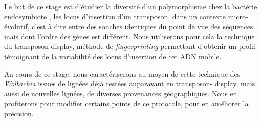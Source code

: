 Le but de ce stage est d'étudier la diversité d'un polymorphisme chez la
bactérie endosymbiote , les locus d'insertion d'un transposon,
dans un contexte micro-évolutif, c'est à dire entre des souches identiques du
point de vue des séquences, mais dont l'ordre des gènes est différent.
Nous utiliserons pour cela la technique du transposon-display, méthode de
\textit{fingerprinting} permettant d'obtenir un profil témoignant de la
variabilité des locus d'insertion de cet ADN mobile.

Au cours de ce stage, nous caractériserons au moyen de cette technique des
\textit{Wolbachia} issues de lignées déjà testées auparavant en transposon-%
display, mais aussi de nouvelles lignées, de diverses provenances
géographiques. Nous en profiterons pour modifier certains points de ce
protocole, pour en améliorer la précision.
